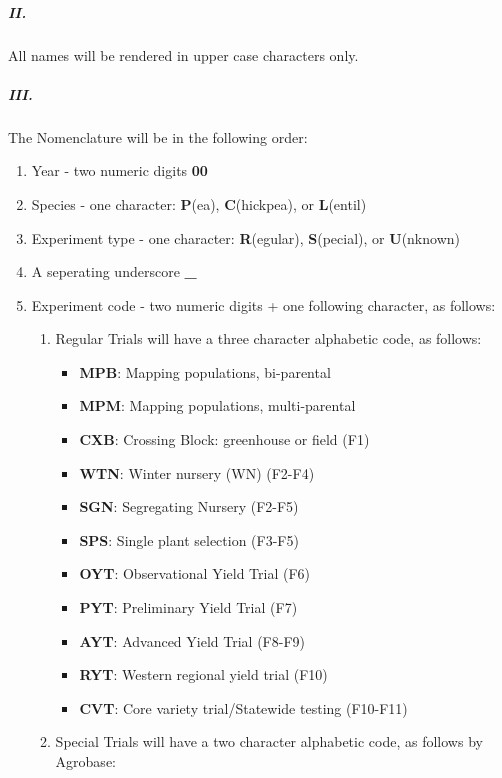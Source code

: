 \documentclass[12pt, letterpaper,oneocolumn]{article}
\begin{document}
\begin{appendices}
\subparagraph{II.} All names will be rendered in upper case characters
only.

\subparagraph{III.} The Nomenclature will be in the following
order:

\begin{enumerate}
\def\labelenumi{\alph{enumi}.}
\item
  Year - two numeric digits \textbf{00}
\item
  Species - one character: \textbf{P}(ea), \textbf{C}(hickpea), or
  \textbf{L}(entil)
\item
  Experiment type - one character: \textbf{R}(egular),
  \textbf{S}(pecial), or \textbf{U}(nknown)
\item
  A seperating underscore \textbf{\_}
\item
  Experiment code - two numeric digits + one following character, as
  follows:

  \begin{enumerate}
  \item
    Regular Trials will have a three character alphabetic code, as
    follows:

    \begin{itemize}
    \item
      \textbf{MPB}: Mapping populations, bi-parental
    \item
      \textbf{MPM}: Mapping populations, multi-parental
    \item
      \textbf{CXB}: Crossing Block: greenhouse or field (F1)
    \item
      \textbf{WTN}: Winter nursery (WN) (F2-F4)
    \item
      \textbf{SGN}: Segregating Nursery (F2-F5)
    \item
      \textbf{SPS}: Single plant selection (F3-F5)
    \item
      \textbf{OYT}: Observational Yield Trial (F6)
    \item
      \textbf{PYT}: Preliminary Yield Trial (F7)
    \item
      \textbf{AYT}: Advanced Yield Trial (F8-F9)
    \item
      \textbf{RYT}: Western regional yield trial (F10)
    \item
      \textbf{CVT}: Core variety trial/Statewide testing (F10-F11)
    \end{itemize}
  \item
    Special Trials will have a two character alphabetic code, as
    follows by Agrobase:


\end{enumerate}
\end{enumerate}
\end{appendices}
\end{document}
